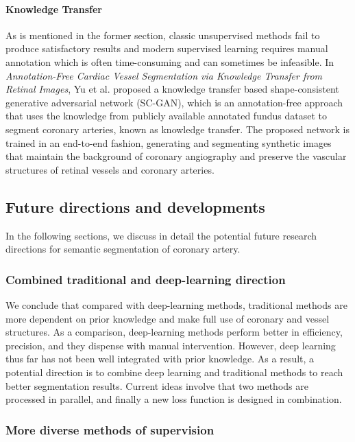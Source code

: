 \documentclass[lang=cn,11pt,a4paper,cite=numbers]{elegantpaper}
\begin{document}
\paragraph{Knowledge Transfer}

As is mentioned in the former section, classic unsupervised methods fail to produce satisfactory results and modern supervised learning requires manual annotation which is often time-consuming and can sometimes be infeasible. In \emph{Annotation-Free Cardiac Vessel Segmentation via Knowledge Transfer from Retinal Images}\cite{23}, Yu et al. proposed a knowledge transfer based shape-consistent generative adversarial network (SC-GAN), which is an annotation-free approach that uses the knowledge from publicly available annotated fundus dataset to segment coronary arteries, known as knowledge transfer. The proposed network is trained in an end-to-end fashion, generating and segmenting synthetic images that maintain the background of coronary angiography and preserve the vascular structures of retinal vessels and coronary arteries.

\subsection{Future directions and developments}

In the following sections, we discuss in detail the potential future research directions for semantic segmentation of coronary artery.

\subsubsection{Combined traditional and deep-learning direction}

We conclude that compared with deep-learning methods, traditional methods are more dependent on prior knowledge and make full use of coronary and vessel structures. As a comparison, deep-learning methods perform better in efficiency, precision, and they dispense with manual intervention. However, deep learning thus far has not been well integrated with prior knowledge. As a result, a potential direction is to combine deep learning and traditional methods to reach better segmentation results. Current ideas involve that two methods are processed in parallel, and finally a new loss function is designed in combination.

\subsubsection{More diverse methods of supervision}
\end{document}
